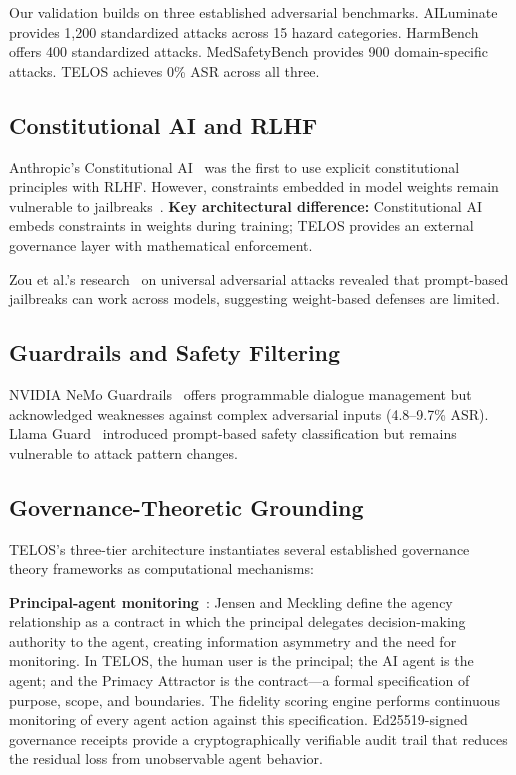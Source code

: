 \documentclass[11pt,twocolumn]{article}
\begin{document}
Our validation builds on three established adversarial benchmarks. AILuminate provides 1,200 standardized attacks across 15 hazard categories. HarmBench offers 400 standardized attacks. MedSafetyBench provides 900 domain-specific attacks. TELOS achieves 0\% ASR across all three.

\subsection{Constitutional AI and RLHF}

Anthropic's Constitutional AI~\citep{bai2022constitutional} was the first to use explicit constitutional principles with RLHF. However, constraints embedded in model weights remain vulnerable to jailbreaks~\citep{wei2023jailbroken}. \textbf{Key architectural difference:} Constitutional AI embeds constraints in weights during training; TELOS provides an external governance layer with mathematical enforcement.

Zou et al.'s research~\citep{zou2023universal} on universal adversarial attacks revealed that prompt-based jailbreaks can work across models, suggesting weight-based defenses are limited.

\subsection{Guardrails and Safety Filtering}

NVIDIA NeMo Guardrails~\citep{rebedea2023nemo} offers programmable dialogue management but acknowledged weaknesses against complex adversarial inputs (4.8--9.7\% ASR). Llama Guard~\citep{inan2023llamaguard} introduced prompt-based safety classification but remains vulnerable to attack pattern changes.

\subsection{Governance-Theoretic Grounding}

TELOS's three-tier architecture instantiates several established governance theory frameworks as computational mechanisms:

\textbf{Principal-agent monitoring}~\citep{jensen1976theory}: Jensen and Meckling define the agency relationship as a contract in which the principal delegates decision-making authority to the agent, creating information asymmetry and the need for monitoring. In TELOS, the human user is the principal; the AI agent is the agent; and the Primacy Attractor is the contract---a formal specification of purpose, scope, and boundaries. The fidelity scoring engine performs continuous monitoring of every agent action against this specification. Ed25519-signed governance receipts provide a cryptographically verifiable audit trail that reduces the residual loss from unobservable agent behavior.
\end{document}
